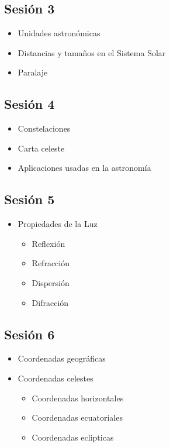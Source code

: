 \documentclass[10pt,a4paper]{article}
\begin{document}
\subsection{Sesión 3}
\begin{itemize}
 \item Unidades astronómicas
 \item Distancias y tamaños en el Sistema Solar
 \item Paralaje
\end{itemize}

\subsection{Sesión 4}
\begin{itemize}
 \item Constelaciones
 \item Carta celeste
 \item Aplicaciones usadas en la astronomía
\end{itemize}

\subsection{Sesión 5}
\begin{itemize}
 \item Propiedades de la Luz
 \begin{itemize}
  \item Reflexión
  \item Refracción
  \item Dispersión
  \item Difracción
 \end{itemize}
\end{itemize}

\subsection{Sesión 6}
\begin{itemize}
 \item Coordenadas geográficas 
 \item Coordenadas celestes
 \begin{itemize}
  \item Coordenadas horizontales
  \item Coordenadas ecuatoriales
  \item Coordenadas eclipticas
 \end{itemize}
\end{itemize}
\end{document}
